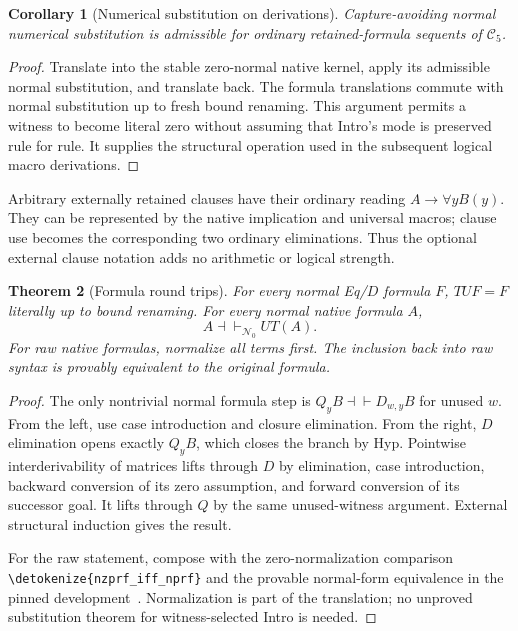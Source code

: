 \documentclass[11pt]{article}
\newtheorem{theorem}{Theorem}[section]
\newtheorem{corollary}[theorem]{Corollary}
\theoremstyle{definition}
\newcommand{\C}{\mathcal C_5}
\newcommand{\NZ}{\mathcal N_0}
\newcommand{\file}[1]{\expandafter\nolinkurl\expandafter{\detokenize{#1}}}
\begin{document}
\begin{corollary}[Numerical substitution on derivations]
Capture-avoiding normal numerical substitution is admissible for ordinary
retained-formula sequents of $\C$.
\end{corollary}
\begin{proof}
Translate into the stable zero-normal native kernel, apply its admissible
normal substitution, and translate back. The formula translations commute
with normal substitution up to fresh bound renaming. This argument permits
a witness to become literal zero without assuming that Intro's mode is
preserved rule for rule. It supplies the structural operation used in the
subsequent logical macro derivations.
\end{proof}

Arbitrary externally retained clauses have their ordinary reading
$A\to\forall yB(y)$. They can be represented by the native implication
and universal macros; clause use becomes the corresponding two ordinary
eliminations. Thus the optional external clause notation adds no arithmetic
or logical strength.

\begin{theorem}[Formula round trips]\label{thm:roundtrips}
For every normal Eq/$D$ formula $F$, $TUF=F$ literally up to bound
renaming. For every normal native formula $A$,
\[
                   A\dashv\vdash_{\NZ}UT(A).
\]
For raw native formulas, normalize all terms first. The inclusion back into
raw syntax is provably equivalent to the original formula.
\end{theorem}
\begin{proof}
The only nontrivial normal formula step is
$Q_yB\dashv\vdash D_{w,y}B$ for unused $w$. From the left, use
case introduction and closure elimination. From the right, $D$
elimination opens exactly $Q_yB$, which closes the branch by Hyp.
Pointwise interderivability of matrices lifts through $D$ by elimination,
case introduction, backward conversion of its zero assumption, and forward
conversion of its successor goal. It lifts through $Q$ by the same
unused-witness argument. External structural induction gives the result.

For the raw statement, compose with the zero-normalization comparison
\file{nzprf_iff_nprf} and the provable normal-form equivalence
in the pinned development~\cite{normal}. Normalization is part of the
translation; no unproved substitution theorem for witness-selected Intro
is needed.
\end{proof}
\end{document}
